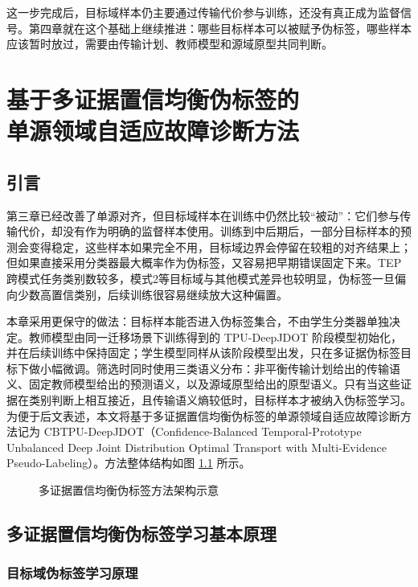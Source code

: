 \documentclass{seuthesis-2022}
\begin{document}
这一步完成后，目标域样本仍主要通过传输代价参与训练，还没有真正成为监督信号。第四章就在这个基础上继续推进：哪些目标样本可以被赋予伪标签，哪些样本应该暂时放过，需要由传输计划、教师模型和源域原型共同判断。

\chapter[基于多证据置信均衡伪标签的单源领域自适应故障诊断方法]{基于多证据置信均衡伪标签的\\单源领域自适应故障诊断方法}
\section{引言}

第三章已经改善了单源对齐，但目标域样本在训练中仍然比较“被动”：它们参与传输代价，却没有作为明确的监督样本使用。训练到中后期后，一部分目标样本的预测会变得稳定，这些样本如果完全不用，目标域边界会停留在较粗的对齐结果上；但如果直接采用分类器最大概率作为伪标签，又容易把早期错误固定下来。TEP 跨模式任务类别数较多，模式2等目标域与其他模式差异也较明显，伪标签一旦偏向少数高置信类别，后续训练很容易继续放大这种偏置。

本章采用更保守的做法：目标样本能否进入伪标签集合，不由学生分类器单独决定。教师模型由同一迁移场景下训练得到的 TPU-DeepJDOT 阶段模型初始化，并在后续训练中保持固定；学生模型同样从该阶段模型出发，只在多证据伪标签目标下做小幅微调。筛选时同时使用三类语义分布：非平衡传输计划给出的传输语义、固定教师模型给出的预测语义，以及源域原型给出的原型语义。只有当这些证据在类别判断上相互接近，且传输语义熵较低时，目标样本才被纳入伪标签学习。为便于后文表述，本文将基于多证据置信均衡伪标签的单源领域自适应故障诊断方法记为 CBTPU-DeepJDOT（Confidence-Balanced Temporal-Prototype Unbalanced Deep Joint Distribution Optimal Transport with Multi-Evidence Pseudo-Labeling）。方法整体结构如图 \ref{fig:ch4_cbtpu_pseudolabel} 所示。

\begin{figure}[!htbp]
    \centering
    \resizebox{\textwidth}{!}{\ignorespaces\unskip}
    \caption{多证据置信均衡伪标签方法架构示意}
    \label{fig:ch4_cbtpu_pseudolabel}
\end{figure}

\section{多证据置信均衡伪标签学习基本原理}
\subsection{目标域伪标签学习原理}
\end{document}
